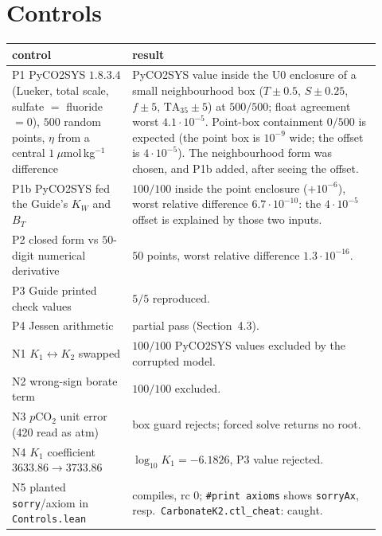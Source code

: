 \documentclass[10pt]{article}
\newcommand{\lean}[1]{\texttt{#1}}
\newcommand{\COtwo}{CO$_2$}
\begin{document}
\section{Controls}\label{sec:controls}
\begin{center}\small\begin{tabular}{p{0.30\linewidth}p{0.62\linewidth}}\toprule
control & result\\\midrule
P1 PyCO2SYS $1.8.3.4$ (Lueker, total scale, sulfate $=$ fluoride $=0$), $500$ random points, $\eta$ from a central $1\ \mu$mol\,kg$^{-1}$ difference & PyCO2SYS value inside the U0 enclosure of a small neighbourhood box ($T\pm0.5$, $S\pm0.25$, $f\pm5$, $\mathrm{TA}_{35}\pm5$) at $500/500$; float agreement worst $4.1\cdot10^{-5}$. Point-box containment $0/500$ is expected (the point box is $10^{-9}$ wide; the offset is $4\cdot10^{-5}$). The neighbourhood form was chosen, and P1b added, after seeing the offset.\\
P1b PyCO2SYS fed the Guide's $K_W$ and $B_T$ & $100/100$ inside the point enclosure ($+10^{-6}$), worst relative difference $6.7\cdot10^{-10}$: the $4\cdot10^{-5}$ offset is explained by those two inputs.\\
P2 closed form vs $50$-digit numerical derivative & $50$ points, worst relative difference $1.3\cdot10^{-16}$.\\
P3 Guide printed check values & $5/5$ reproduced.\\
P4 Jessen arithmetic & partial pass (Section~4.3).\\
N1 $K_1\leftrightarrow K_2$ swapped & $100/100$ PyCO2SYS values excluded by the corrupted model.\\
N2 wrong-sign borate term & $100/100$ excluded.\\
N3 $p$\COtwo{} unit error (420 read as atm) & box guard rejects; forced solve returns no root.\\
N4 $K_1$ coefficient $3633.86\to3733.86$ & $\log_{10}K_1=-6.1826$, P3 value rejected.\\
N5 planted \lean{sorry}/axiom in \texttt{Controls.lean} & compiles, rc $0$; \texttt{\#print axioms} shows \lean{sorryAx}, resp.\ \lean{CarbonateK2.ctl\_cheat}: caught.\\\bottomrule
\end{tabular}\end{center}

\end{document}
